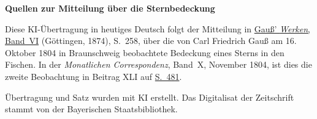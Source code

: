 \clearpage\thispagestyle{empty}
\begin{center}\textbf{Quellen zur Mitteilung über die Sternbedeckung}\end{center}
\noindent Diese KI-Übertragung in heutiges Deutsch folgt der Mitteilung in \href{https://gdz.sub.uni-goettingen.de/id/PPN236007467}{Gauß’ \textit{Werken}, Band~VI} (Göttingen, 1874), S.~258, über die von Carl Friedrich Gauß am 16. Oktober 1804 in Braunschweig beobachtete Bedeckung eines Sterns in den Fischen. In der \textit{Monatlichen Correspondenz}, Band~X, November 1804, ist dies die zweite Beobachtung in Beitrag XLI auf \href{https://www.digitale-sammlungen.de/en/view/bsb10538602?page=495}{S.~481}.
\par\smallskip\noindent Übertragung und Satz wurden mit KI erstellt. Das Digitalisat der Zeitschrift stammt von der Bayerischen Staatsbibliothek.
\clearpage
